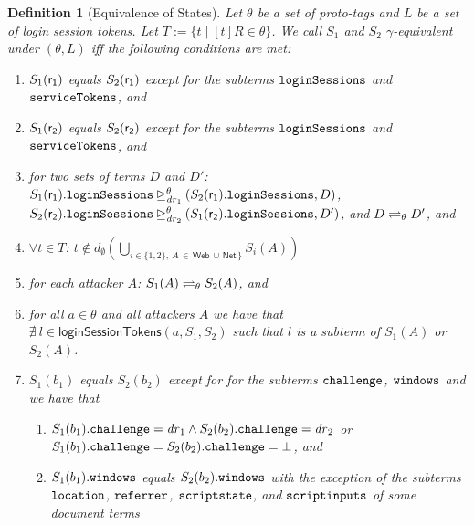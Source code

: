 \documentclass[letterpaper,onecolumn,10pt]{article}
\newtheorem{definition}{Definition}
\begin{document}
\begin{definition}[Equivalence of States]\label{def:eq-of-states}
  Let $\theta$ be a set of proto-tags and 
  $L$ be a set of login session tokens.
  Let $T:=\{t\mid [t]R\in \theta\}$. 
  We call $S_1$ and $S_2$ \emph{$\gamma$-equivalent under 
  $(\theta, L)$} iff the following conditions are met:
  \begin{enumerate}
  \item\label{eqs:r1} $S_1(\fAP{r_1})$ equals $S_2(\fAP{r_1})$ except
    for the subterms $\str{loginSessions}$ and $\str{serviceTokens}$, and
  \item\label{eqs:r2} $S_1(\fAP{r_2})$ equals $S_2(\fAP{r_2})$ except
    for the subterms $\str{loginSessions}$ and $\str{serviceTokens}$, and
  \item\label{eqs:logsess} for two sets of terms $D$ and $D'$:
    $\logsessminus{S_1(\fAP{r_1}).\str{loginSessions}}{S_2(\fAP{r_1}).\str{loginSessions}}{\theta}{\mi{dr}_1}{D}$,
    $\logsessminus{S_2(\fAP{r_2}).\str{loginSessions}}{S_1(\fAP{r_2}).\str{loginSessions}}{\theta}{\mi{dr}_2}{D'}$,
    and $D \prototagequiv{\theta} D'$, and
  \item\label{eqs:att-not-t} $\forall t \in T$:
    $t \not\in d_\emptyset(\bigcup_{i \in \{1,2\},\ A\, \in\, \mathsf{Web}\, \cup \,
    \mathsf{Net}\, 
    \}}S_i(A))$
  \item\label{eqs:att} for each attacker $A$:
    $S_1(A) \prototagequiv{\theta} S_2(A)$, and
  \item\label{eqs:att-not-l} for all $a\in\theta$ and all attackers $A$ we have that
    $\nexists\ l \in \mathsf{loginSessionTokens}(a,S_1,S_2)$ such that
    $l$ is a subterm of $S_1(A)$ or $S_2(A)$.
  \item\label{eqs:b} $S_1(b_1)$ equals $S_2(b_2)$ except for for the
    subterms $\str{challenge}$, $\str{windows}$
    and we have that
    \begin{enumerate}
    \item \label{eqs:b:challenge}
      $S_1(b_1).\str{challenge} = \mi{dr}_1 \wedge
      S_2(b_2).\str{challenge} = \mi{dr}_2$
      or $S_1(b_1).\str{challenge} = S_2(b_2).\str{challenge} = \bot$,
      and
    \item $S_1(b_1).\str{windows}$ equals $S_2(b_2).\str{windows}$ with
      the exception of the subterms $\str{location}$, $\str{referrer}$,
      $\str{scriptstate}$, and $\str{scriptinputs}$ of some document terms

\end{enumerate}
\end{enumerate}
\end{definition}
\end{document}
